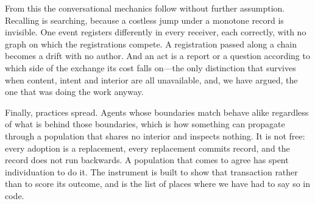 \documentclass[11pt,a4paper]{article}
\theoremstyle{clstyle}
\theoremstyle{definition}
\theoremstyle{remark}
\begin{document}
From this the conversational mechanics follow without further assumption.
Recalling is searching, because a costless jump under a monotone record is
invisible. One event registers differently in every receiver, each correctly,
with no graph on which the registrations compete. A registration passed
along a chain becomes a drift with no author. And an act is a report or a
question according to which side of the exchange its cost falls on---the
only distinction that survives when content, intent and interior are all
unavailable, and, we have argued, the one that was doing the work anyway.

Finally, practices spread. Agents whose boundaries match behave alike
regardless of what is behind those boundaries, which is how something can
propagate through a population that shares no interior and inspects nothing.
It is not free: every adoption is a replacement, every replacement commits
record, and the record does not run backwards. A population that comes to
agree has spent individuation to do it. The instrument is built to show that
transaction rather than to score its outcome, and
 is the list of places where we have had to say so in
code.



\end{document}
